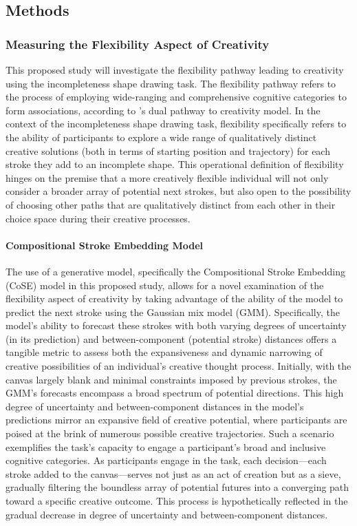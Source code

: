 \documentclass[../Proposal.tex]{subfiles}
\begin{document}
\subsection*{Methods}

\subsubsection*{Measuring the Flexibility Aspect of Creativity}
This proposed study will investigate the flexibility pathway leading to creativity using the incompleteness shape drawing task. The flexibility pathway refers to the process of employing wide-ranging and comprehensive cognitive categories to form associations, according to \textcite{nijstad_dual_2010}'s dual pathway to creativity model. In the context of the incompleteness shape drawing task, flexibility specifically refers to the ability of participants to explore a wide range of qualitatively distinct creative solutions (both in terms of starting position and trajectory) for each stroke they add to an incomplete shape. This operational definition of flexibility hinges on the premise that a more creatively flexible individual will not only consider a broader array of potential next strokes, but also open to the possibility of choosing other paths that are qualitatively distinct from each other in their choice space during their creative processes.

\paragraph*{Compositional Stroke Embedding Model}
The use of a generative model, specifically the Compositional Stroke Embedding (CoSE) model in this proposed study, allows for a novel examination of the flexibility aspect of creativity by taking advantage of the ability of the model to predict the next stroke using the Gaussian mix model (GMM). Specifically, the model's ability to forecast these strokes with both varying degrees of uncertainty (in its prediction) and between-component (potential stroke) distances offers a tangible metric to assess both the expansiveness and dynamic narrowing of creative possibilities of an individual's creative thought process. Initially, with the canvas largely blank and minimal constraints imposed by previous strokes, the GMM's forecasts encompass a broad spectrum of potential directions. This high degree of uncertainty and between-component distances in the model's predictions mirror an expansive field of creative potential, where participants are poised at the brink of numerous possible creative trajectories. Such a scenario exemplifies the task's capacity to engage a participant's broad and inclusive cognitive categories. As participants engage in the task, each decision—each stroke added to the canvas—serves not just as an act of creation but as a sieve, gradually filtering the boundless array of potential futures into a converging path toward a specific creative outcome. This process is hypothetically reflected in the gradual decrease in degree of uncertainty and between-component distances.
\end{document}
